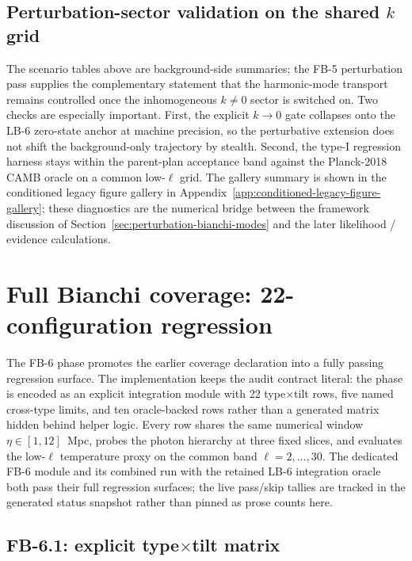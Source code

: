\subsection{Perturbation-sector validation on the shared $k$ grid}

The scenario tables above are background-side summaries; the
FB-5 perturbation pass supplies the complementary statement that
the harmonic-mode transport remains controlled once the
inhomogeneous $k \neq 0$ sector is switched on.  Two checks are
especially important.  First, the explicit $k \rightarrow 0$
gate collapses onto the LB-6 zero-state anchor at machine
precision, so the perturbative extension does not shift the
background-only trajectory by stealth.  Second, the type-I
regression harness stays within the parent-plan acceptance band
against the Planck-2018 CAMB oracle on a common low-$\ell$ grid.
The gallery summary is shown in
the conditioned legacy figure gallery in Appendix~\ref{app:conditioned-legacy-figure-gallery}; these diagnostics are
the numerical bridge between the framework discussion of
Section~\ref{sec:perturbation-bianchi-modes} and the later
likelihood / evidence calculations.


\section{Full Bianchi coverage: 22-configuration regression}
\label{sec:fb6-full-coverage}

The FB-6 phase promotes the earlier coverage declaration into a fully
passing regression surface.  The implementation keeps the audit contract
literal: the phase is encoded as an explicit integration module with
22 type$\times$tilt rows, five named cross-type limits, and ten
oracle-backed rows rather than a generated matrix hidden behind helper
logic.  Every row shares the same numerical window
$\eta \in [1, 12]$~Mpc, probes the photon hierarchy at three fixed
slices, and evaluates the low-$\ell$ temperature proxy on the common
band $\ell = 2,\dots,30$.  The dedicated FB-6 module and its combined
run with the retained LB-6 integration oracle both pass their full
regression surfaces; the live pass/skip tallies are tracked in the
generated status snapshot rather than pinned as prose counts here.

\subsection{FB-6.1: explicit type$\times$tilt matrix}

